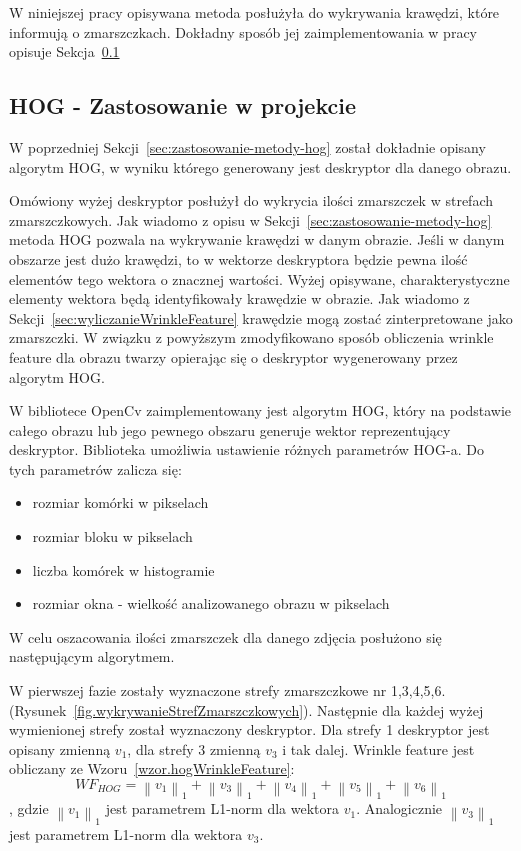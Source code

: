 \documentclass[a4paper,twoside,12pt]{book}
\begin{document}
    W niniejszej pracy opisywana metoda posłużyła do wykrywania krawędzi, które informują o zmarszczkach. Dokładny sposób jej
    zaimplementowania w pracy opisuje Sekcja~\ref{subsec:zastosowanie-w-projekcie2}

    \subsection{HOG - Zastosowanie w projekcie}\label{subsec:zastosowanie-w-projekcie2}
    W poprzedniej Sekcji~\ref{sec:zastosowanie-metody-hog} został dokładnie opisany algorytm HOG, w wyniku którego
    generowany jest deskryptor dla danego obrazu.

    Omówiony wyżej deskryptor posłużył do wykrycia ilości zmarszczek w strefach zmarszczkowych. Jak wiadomo z opisu w
    Sekcji~\ref{sec:zastosowanie-metody-hog} metoda HOG pozwala na wykrywanie krawędzi w danym obrazie. Jeśli w danym
    obszarze jest dużo krawędzi, to w wektorze deskryptora będzie pewna ilość elementów tego wektora o znacznej wartości.
    Wyżej opisywane, charakterystyczne elementy wektora będą identyfikowały krawędzie w obrazie. Jak wiadomo z
    Sekcji~\ref{sec:wyliczanieWrinkleFeature} krawędzie mogą zostać zinterpretowane jako zmarszczki.
    W związku z powyższym zmodyfikowano sposób obliczenia wrinkle feature dla obrazu twarzy opierając się o
    deskryptor wygenerowany przez algorytm HOG.

    W bibliotece OpenCv zaimplementowany jest algorytm HOG, który na podstawie całego
    obrazu lub jego pewnego obszaru generuje wektor reprezentujący deskryptor. Biblioteka umożliwia ustawienie różnych parametrów HOG-a.
    Do tych parametrów zalicza się:
    \begin{itemize}
        \item rozmiar komórki w pikselach
        \item rozmiar bloku w pikselach
        \item liczba komórek w histogramie
        \item rozmiar okna - wielkość analizowanego obrazu w pikselach
    \end{itemize}

    W celu oszacowania ilości zmarszczek dla danego zdjęcia posłużono się następującym algorytmem.

    W pierwszej fazie zostały wyznaczone strefy zmarszczkowe nr 1,3,4,5,6.
    (Rysunek~\ref{fig.wykrywanieStrefZmarszczkowych}).
    Następnie dla każdej wyżej wymienionej strefy został wyznaczony deskryptor. Dla strefy 1 deskryptor jest opisany
    zmienną $v_{1}$, dla strefy 3 zmienną $v_{3}$ i tak dalej.
    Wrinkle feature jest obliczany ze Wzoru~\ref{wzor.hogWrinkleFeature}:
    \large
    \begin{equation}
        WF_{HOG} = \left \|v_{1}  \right \|_{1}+\left \|v_{3}  \right \|_{1}+\left \|v_{4}  \right \|_{1}+\left
        \|v_{5}  \right \|_{1}+\left \|v_{6}  \right \|_{1}
        \label{wzor.hogWrinkleFeature}
    \end{equation}
    \normalsize
    , gdzie $\left \|v_{1}  \right \|_{1}$ jest parametrem L1-norm dla wektora $v_{1}$. Analogicznie $\left \|v_{3}
    \right \|_{1}$  jest parametrem L1-norm dla wektora $v_{3}$.
\end{document}
